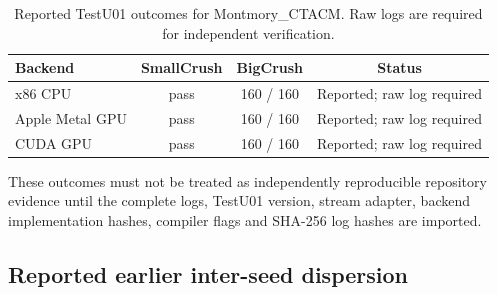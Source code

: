\documentclass[11pt,a4paper]{article}
\begin{document}
\begin{table}[h]
\centering
\caption{Reported TestU01 outcomes for Montmory\_CTACM. Raw logs are required for independent verification.}
\begin{tabular}{lccc}
\toprule
Backend & SmallCrush & BigCrush & Status \\
\midrule
x86 CPU & pass & 160 / 160 & Reported; raw log required \\
Apple Metal GPU & pass & 160 / 160 & Reported; raw log required \\
CUDA GPU & pass & 160 / 160 & Reported; raw log required \\
\bottomrule
\end{tabular}
\end{table}

These outcomes must not be treated as independently reproducible repository evidence until the complete logs, TestU01 version, stream adapter, backend implementation hashes, compiler flags and SHA-256 log hashes are imported.

\subsection{Reported earlier inter-seed dispersion}

\begin{table}[h]
\centering
\caption{Reported earlier structural dispersion, $N=10^6$, $R=8$, 100 seeds. Raw tables are required for independent verification.}
\end{table}
\end{document}
